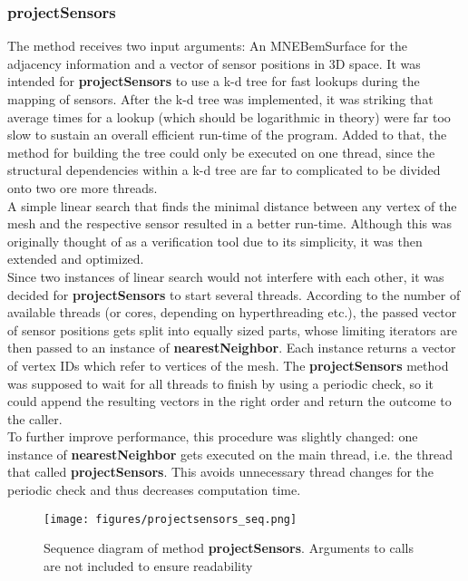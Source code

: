 \subsubsection{projectSensors}
The method  receives two input arguments: An MNEBemSurface for the adjacency information and a vector of sensor positions in 3D space. It was intended for \textbf{projectSensors} to use a k-d tree for fast lookups during the mapping of sensors. After the k-d tree was implemented, it was striking that average times for a lookup (which should be logarithmic in theory) were far too slow to sustain an overall efficient run-time of the program. Added to that, the method for building the tree could only be executed on one thread, since the structural dependencies within a k-d tree are far to complicated to be divided onto two ore more threads.\\
A simple linear search that finds the minimal distance between any vertex of the mesh and the respective sensor resulted in a better run-time. Although this was originally thought of as a verification tool due to its simplicity, it was then extended and optimized.\\
Since two instances of linear search would not interfere with each other, it was decided for \textbf{projectSensors} to start several threads.
According to the number of available threads (or cores, depending on hyperthreading etc.), the passed vector of sensor positions gets split into equally sized parts, whose limiting iterators are then passed to an instance of \textbf{nearestNeighbor}. Each instance returns a vector of vertex IDs which refer to vertices of the mesh. The \textbf{projectSensors} method was supposed to wait for all threads to finish by using a periodic check, so it could append the resulting vectors in the right order and return the outcome to the caller.\\
To further improve performance, this procedure was slightly changed: one instance of \textbf{nearestNeighbor} gets executed on the main thread, i.e. the thread that called \textbf{projectSensors}. This avoids unnecessary thread changes for the periodic check and thus decreases computation time.

\clearpage

\begin{figure}[h]
	\begin{center}
		\texttt{[image: figures/projectsensors\_seq.png]}
		\caption{Sequence diagram of method \textbf{projectSensors}. Arguments to calls are not included to ensure readability}
	\end{center}
\end{figure}

